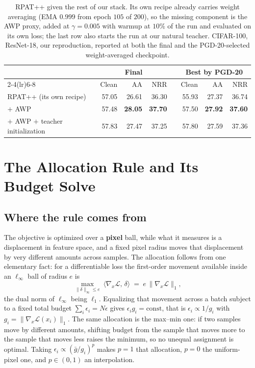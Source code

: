 \begin{table}[!htbp]
  \centering \small \setlength{\tabcolsep}{4.5pt}
  \caption{RPAT++ given the rest of our stack. Its own recipe already carries weight averaging (EMA
  $0.999$ from epoch $105$ of $200$), so the missing component is the AWP proxy, added at
  $\gamma = 0.005$ with warmup at $10\%$ of the run and evaluated on its own loss; the last row also
  starts the run at our natural teacher. CIFAR-100, ResNet-18, our reproduction, reported at both the
  final and the PGD-20-selected weight-averaged checkpoint.}
  \label{tab:rpatstack}
  \begin{tabular}{lrrrcrrr}
    \toprule
    & \multicolumn{3}{c}{Final} & & \multicolumn{3}{c}{Best by PGD-20} \\
    \cmidrule(lr){2-4}\cmidrule(lr){6-8}
    & Clean & AA & NRR & & Clean & AA & NRR \\
    \midrule
    RPAT++ (its own recipe)   & 57.05 & 26.61 & 36.30 & & 55.93 & 27.37 & 36.74 \\
    \quad $+$ AWP             & 57.48 & \textbf{28.05} & \textbf{37.70} & & 57.50 & \textbf{27.92} & \textbf{37.60} \\
    \quad $+$ AWP $+$ teacher initialization & 57.83 & 27.47 & 37.25 & & 57.80 & 27.59 & 37.36 \\
    \bottomrule
  \end{tabular}
\end{table}

\section{The Allocation Rule and Its Budget Solve}
\label{app:box}

\subsection{Where the rule comes from}

The objective is optimized over a \textbf{pixel} ball, while what it measures is a displacement in
feature space, and a fixed pixel radius moves that displacement by very different amounts across
samples. The allocation follows from one elementary fact: for a differentiable loss the first-order
movement available inside an $\ell_\infty$ ball of radius $e$ is
\begin{equation}
\max_{\lVert\delta\rVert_\infty \le e}\ \langle \nabla_x \mathcal{L},\, \delta\rangle
\;=\; e\,\lVert \nabla_x \mathcal{L}\rVert_1 ,
\label{eqn:dual}
\end{equation}
the dual norm of $\ell_\infty$ being $\ell_1$. Equalizing that movement across a batch subject to a
fixed total budget $\sum_i \epsilon_i = N\epsilon$ gives $\epsilon_i g_i = \mathrm{const}$, that is
$\epsilon_i \propto 1/g_i$ with $g_i = \lVert\nabla_x\mathcal{L}(x_i)\rVert_1$. The same allocation is
the max--min one: if two samples move by different amounts, shifting budget from the sample that moves
more to the sample that moves less raises the minimum, so no unequal assignment is optimal. Taking
$\epsilon_i \propto (\bar g/g_i)^p$ makes $p=1$ that allocation, $p=0$ the uniform-pixel one, and
$p \in (0,1)$ an interpolation.

